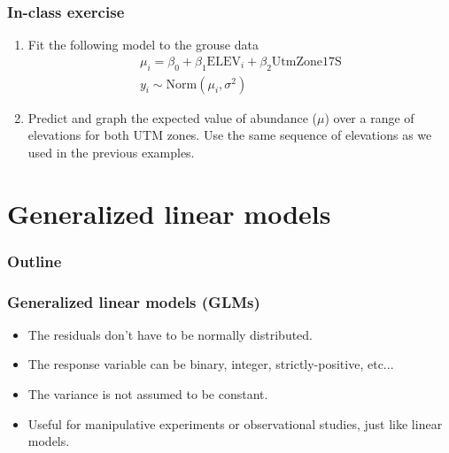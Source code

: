 \documentclass[color=usenames,dvipsnames]{beamer}\usepackage[]{graphicx}\usepackage[]{color}
\begin{document}
\begin{frame}
  \frametitle{In-class exercise}
  \begin{enumerate}
    \item Fit the following model to the grouse data
      \begin{gather*}
        \mu_i = \beta_0 + \beta_1\mathrm{ELEV}_i + \beta_2\mathrm{UtmZone17S}\\
        y_i \sim \mathrm{Norm}(\mu_i,\sigma^2)
      \end{gather*}
    \item Predict and graph the expected value of abundance ($\mu$)
      over a range of elevations for both UTM zones. Use the same
      sequence of elevations as we used in the previous examples.
  \end{enumerate}
\end{frame}






\section{Generalized linear models}



\begin{frame}[plain]
  \frametitle{Outline}
  \Large
  \tableofcontents[currentsection]
\end{frame}




\begin{frame}
  \frametitle{Generalized linear models (GLMs)}
  \large
  \begin{itemize}%
    \item<2-> The residuals don't have to be normally distributed.
    \item<3-> The response variable can be binary, integer,
      strictly-positive, etc...
    \item<4-> The variance is not assumed to be constant.
    \item<5-> Useful for manipulative experiments or observational
      studies, just like linear models.
  \end{itemize}
  \vfill
\end{frame}
\end{document}
